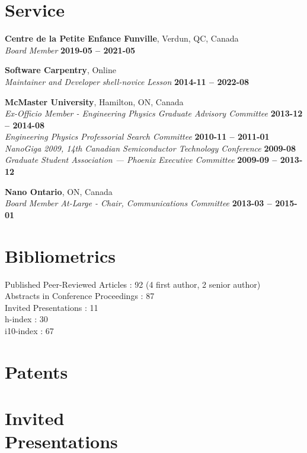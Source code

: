 \documentclass[margin1,line,canadian]{resume}
\begin{document}
\begin{resume}
\section{\mysidestyle{}Service}
\textbf{Centre de la Petite Enfance Funville}, Verdun, QC, Canada\\%
\textsl{Board Member} \hfill \textbf{2019-05 -- 2021-05}

\textbf{Software Carpentry}, Online\\%
\textsl{Maintainer and Developer shell-novice Lesson} \hfill \textbf{2014-11 -- 2022-08}

\textbf{McMaster University}, Hamilton, ON, Canada\\%
\textsl{Ex-Officio Member - Engineering Physics Graduate Advisory Committee} \hfill \textbf{2013-12 -- 2014-08}\\
\textsl{Engineering Physics Professorial Search Committee} \hfill \textbf{2010-11 -- 2011-01}\\
\textsl{NanoGiga 2009, 14th Canadian Semiconductor Technology Conference} \hfill \textbf{2009-08}\\
\textsl{Graduate Student Association --- Phoenix Executive Committee} \hfill \textbf{2009-09 -- 2013-12}

\textbf{Nano Ontario}, ON, Canada\\%
\textsl{Board Member At-Large - Chair, Communications Committee} \hfill \textbf{2013-03 -- 2015-01}\\

\section{\mysidestyle{}Bibliometrics}
Published Peer-Reviewed Articles : 92 (4 first author, 2 senior author)\\
Abstracts in Conference Proceedings : 87\\
Invited Presentations : 11\\
h-index : 30\\
i10-index : 67

 \section{\mysidestyle{}Patents}
 \begin{refsection}
  \newrefcontext[sorting=ymdnt]
  \nocite{*}
  \printbibliography[heading=none]
 \end{refsection}
 \section{\mysidestyle{}Invited\\Presentations}
 \begin{refsection}
  \newrefcontext[sorting=ymdnt]
  \nocite{*}
  \printbibliography[heading=none]
 \end{refsection}

\end{resume}
\end{document}

